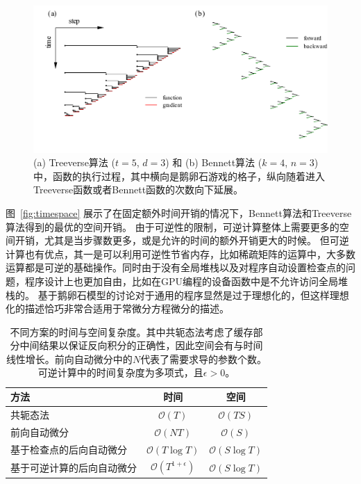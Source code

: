 \documentclass[A4,twoside,fontset=ubuntu,UTF8]{ctexart}
\newcommand{\bigO}{{\mathcal{O}}}
\begin{document}
\begin{figure}
    \centerline{\includegraphics[width=0.88\columnwidth,trim={0 0cm 0 0cm},clip]{bennett_treeverse_fingerprint.pdf}}
    \caption{(a) Treeverse算法 ($t=5$, $d=3$) 和 (b) Bennett算法 ($k=4$, $n=3$) 中，函数的执行过程，其中横向是鹅卵石游戏的格子，纵向随着进入Treeverse函数或者Bennett函数的次数向下延展。}\label{fig:tradeoff}
\end{figure}

图~\ref{fig:timespace} 展示了在固定额外时间开销的情况下，Bennett算法和Treeverse算法得到的最优的空间开销。
由于可逆性的限制，可逆计算整体上需要更多的空间开销，尤其是当步骤数更多，或是允许的时间的额外开销更大的时候。
但可逆计算也有优点，其一是可以利用可逆性节省内存，比如稀疏矩阵的运算中，大多数运算都是可逆的基础操作。同时由于没有全局堆栈以及对程序自动设置检查点的问题，程序设计上也更加自由，比如在GPU编程的设备函数中是不允许访问全局堆栈的。
基于鹅卵石模型的讨论对于通用的程序显然是过于理想化的，但这样理想化的描述恰巧非常合适用于常微分方程微分的描述。

\begin{table}\centering
    \begin{tabularx}{0.7\textwidth}{Xcc}\toprule
        \textbf{方法} & 时间 & 空间\\
        \hline
        共轭态法                     &  $\bigO(T)$          & $\bigO(TS)$\\
        前向自动微分                 &  $\bigO(NT)$         & $\bigO(S)$  \\
        基于检查点的后向自动微分     &  $\bigO(T\log T)$    & $\bigO(S\log T)$   \\
        基于可逆计算的后向自动微分   &  $\bigO(T^{1+\epsilon})$ & $\bigO(S\log T)$ \\
        \bottomrule
    \end{tabularx}
    \caption{不同方案的时间与空间复杂度。其中共轭态法考虑了缓存部分中间结果以保证反向积分的正确性，因此空间会有与时间线性增长。前向自动微分中的$N$代表了需要求导的参数个数。可逆计算中的时间复杂度为多项式，且$\epsilon > 0$。}\label{tbl:complexity}
\end{table}
\end{document}
